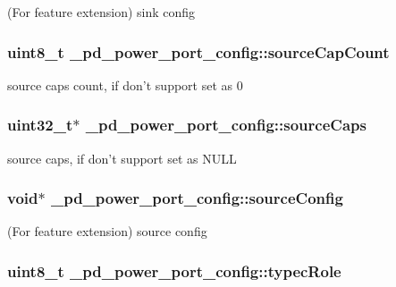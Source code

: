 (For feature extension) sink config \hypertarget{struct__pd__power__port__config_a7cf6689616437623deb3b42e5467e26f}{
\subsubsection[{source\-Cap\-Count}]{\setlength{\rightskip}{0pt plus 5cm}uint8\-\_\-t \-\_\-pd\-\_\-power\-\_\-port\-\_\-config\-::source\-Cap\-Count}}\label{struct__pd__power__port__config_a7cf6689616437623deb3b42e5467e26f}
source caps count, if don't support set as 0 \hypertarget{struct__pd__power__port__config_a12847f31ee382d4bdee4067c9ee177f4}{
\subsubsection[{source\-Caps}]{\setlength{\rightskip}{0pt plus 5cm}uint32\-\_\-t$\ast$ \-\_\-pd\-\_\-power\-\_\-port\-\_\-config\-::source\-Caps}}\label{struct__pd__power__port__config_a12847f31ee382d4bdee4067c9ee177f4}
source caps, if don't support set as N\-U\-L\-L \hypertarget{struct__pd__power__port__config_a8e04f0c0092776ec0f354cf23ce48057}{
\subsubsection[{source\-Config}]{\setlength{\rightskip}{0pt plus 5cm}void$\ast$ \-\_\-pd\-\_\-power\-\_\-port\-\_\-config\-::source\-Config}}\label{struct__pd__power__port__config_a8e04f0c0092776ec0f354cf23ce48057}
(For feature extension) source config \hypertarget{struct__pd__power__port__config_a649079672f270a65578bd41e0e624e16}{
\subsubsection[{typec\-Role}]{\setlength{\rightskip}{0pt plus 5cm}uint8\-\_\-t \-\_\-pd\-\_\-power\-\_\-port\-\_\-config\-::typec\-Role}}\label{struct__pd__power__port__config_a649079672f270a65578bd41e0e624e16}
